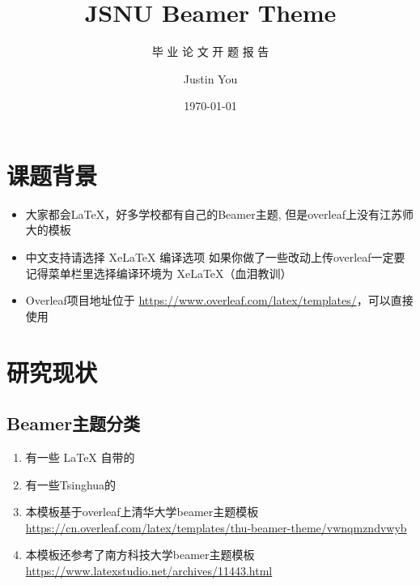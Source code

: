 \documentclass{beamer}
\author{Justin  You}
\title{JSNU Beamer Theme}
\subtitle{毕 业 论 文 开 题 报 告}
\institute{江苏师范大学数学与统计学院}     %
\date{\today}
\begin{document}
    \kaishu {}
	
	\begin{frame}
		\titlepage
	\end{frame}
	
	\begin{frame}
		\tableofcontents[sectionstyle=show,subsectionstyle=show/shaded/hide,subsubsectionstyle=show/shaded/hide]
	\end{frame}
		
	
	\section{课题背景}
	
		\begin{frame}
			\begin{itemize}[<+-| alert@+>] 
				\item 大家都会\LaTeX{}，好多学校都有自己的Beamer主题, 但是overleaf上没有江苏师大的模板
				\item 中文支持请选择 Xe\LaTeX{} 编译选项 \qquad 如果你做了一些改动上传overleaf一定要记得菜单栏里选择编译环境为 Xe\LaTeX{}（血泪教训）
				\item Overleaf项目地址位于 \url{https://www.overleaf.com/latex/templates/}，可以直接使用
			\end{itemize}
		\end{frame}
	
	\section{研究现状}
	    \subsection{Beamer主题分类}	
	    
		\begin{frame}
			\begin{enumerate}
				\item<1-> 有一些 \LaTeX{} 自带的
				\item<2-> 有一些Tsinghua的
				\item<3-> 本模板基于overleaf上清华大学beamer主题模板 \newline \url{https://cn.overleaf.com/latex/templates/thu-beamer-theme/vwnqmzndvwyb}
				\item<4-> 本模板还参考了南方科技大学beamer主题模板 
				\newline
				\url{https://www.latexstudio.net/archives/11443.html}
			\end{enumerate}	
		\end{frame}
	
\end{document}
